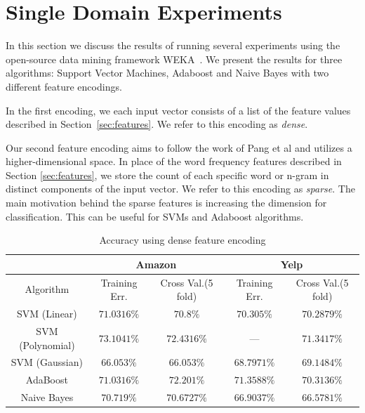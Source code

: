 \documentclass[letterpaper]{article}
\begin{document}
\section{Single Domain Experiments}
\label{sec:single_domain}  
In this section we discuss the results of running several experiments using 
the open-source data mining framework WEKA~\cite{weka}.  We present the results 
for three algorithms: Support Vector Machines, Adaboost and Naive Bayes with 
two different feature encodings.

In the first encoding, we each input vector consists of a list of the feature
values described in Section~\ref{sec:features}. We refer to this encoding as 
\emph{dense}.

Our second feature encoding aims to follow the work of Pang et al 
\cite{PangSentimentClassification} and utilizes a higher-dimensional space. In 
place of the word frequency features described in Section \ref{sec:features}, 
we store the count of each specific word or n-gram in distinct components of 
the input vector.  We refer to this encoding as \emph{sparse}. The
main motivation behind the sparse features is increasing the dimension
for classification. This can be useful for SVMs and Adaboost
algorithms.

\begin{table}[ht]
\centering
\begin{tabular}{c | c c | c c}
 & \multicolumn{2}{|c|}{Amazon} & \multicolumn{2}{|c}{Yelp} \\
\hline
Algorithm & Training Err. & Cross Val.(5 fold) & Training Err. & Cross Val.(5 fold)\\
\hline
SVM (Linear) 		& $71.0316\%$ & $70.8\%$ & $70.305\%$ & $70.2879\%$\\
SVM (Polynomial) 	& $73.1041\%$ & $72.4316\%$ & --- & $71.3417\%$\\
SVM (Gaussian) 		& $66.053\%$ & $66.053\%$ & $68.7971\%$ & $69.1484\%$\\
AdaBoost 			& $71.0316\%$ & $72.201\%$ & $71.3588\%$ & $70.3136\%$\\ 
Naive Bayes 		& $70.719\%$ & $70.6727\%$ & $66.9037\%$ & $66.5781\%$\\ 
\end{tabular}
\caption{Accuracy using dense feature encoding}
\label{tab:dense}
\end{table}
\end{document}
